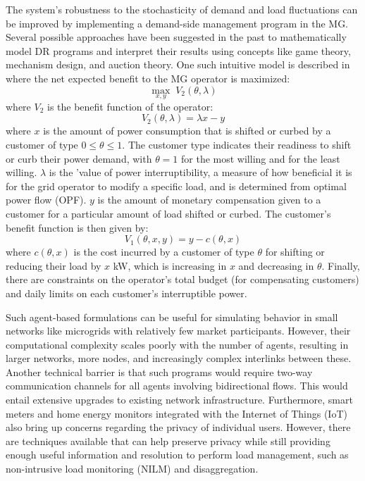 \documentclass[final,3p,times]{elsarticle}
\begin{document}
The system's robustness to the stochasticity of demand and load fluctuations can be improved by implementing a demand-side management program in the MG. Several possible approaches have been suggested in the past to mathematically model DR programs and interpret their results using concepts like game theory, mechanism design, and auction theory. One such intuitive model is described in \cite{nwulu2017} where the net expected benefit to the MG operator is maximized:  
\begin{equation}
    \max_{x,y} \; V_2 (\theta, \lambda)
\end{equation}
where $V_2$ is the benefit function of the operator:
\begin{equation}
    V_2 (\theta, \lambda) = \lambda x - y
\end{equation}
where $x$ is the amount of power consumption that is shifted or curbed by a customer of type $ 0 \leq \theta \leq 1$. The customer type indicates their readiness to shift or curb their power demand, with $\theta = 1$ for the most willing and for the least willing. $\lambda$ is the 'value of power interruptibility, a measure of how beneficial it is for the grid operator to modify a specific load, and is determined from optimal power flow (OPF). $y$ is the amount of monetary compensation given to a customer for a particular amount of load shifted or curbed. The customer's benefit function is then given by:
\begin{equation}
    V_1(\theta,x,y) = y - c(\theta,x)
\end{equation}
where $c(\theta,x)$ is the cost incurred by a customer of type $\theta$ for shifting or reducing their load by $x$ kW, which is increasing in $x$ and decreasing in $\theta$. Finally, there are constraints on the operator's total budget (for compensating customers) and daily limits on each customer's interruptible power.

Such agent-based formulations can be useful for simulating behavior in small networks like microgrids with relatively few market participants. However, their computational complexity scales poorly with the number of agents, resulting in larger networks, more nodes, and increasingly complex interlinks between these. Another technical barrier is that such programs would require two-way communication channels for all agents involving bidirectional flows. This would entail extensive upgrades to existing network infrastructure. Furthermore, smart meters and home energy monitors integrated with the Internet of Things (IoT) also bring up concerns regarding the privacy of individual users. However, there are techniques available that can help preserve privacy while still providing enough useful information and resolution to perform load management, such as non-intrusive load monitoring (NILM) and disaggregation. 
\end{document}
